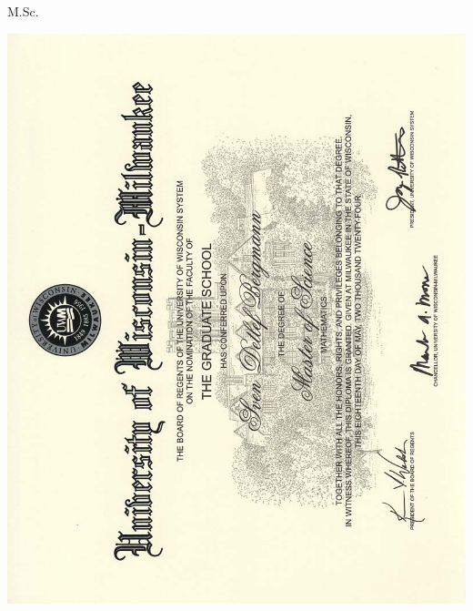 \certificate{} M.Sc. \uwm
\vfill
\begin{center}
    \includegraphics[scale=0.65]{include/certificates/Masterdiplom_UWM}
\end{center}
\vfill
